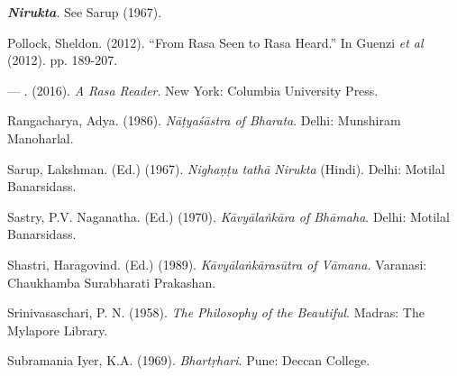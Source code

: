 \begin{thebibliography}{99}
  \textit{\textbf{Nirukta}}. See Sarup (1967).

  Pollock, Sheldon. (2012). “From Rasa Seen to Rasa Heard.” In Guenzi \textit{et al} (2012). pp. 189-207.

  — . (2016). \textit{A Rasa Reader}. New York: Columbia University Press.

  Rangacharya, Adya. (1986). \textit{Nāṭyaśāstra of Bharata}. Delhi: Munshiram Manoharlal.

  Sarup, Lakshman. (Ed.) (1967). \textit{Nighaṇṭu tathā Nirukta} (Hindi). Delhi: Motilal Banarsidass.

  Sastry, P.V. Naganatha. (Ed.) (1970).\textit{ Kāvyālaṅkāra of Bhāmaha}. Delhi: Motilal Banarsidass.

  Shastri, Haragovind. (Ed.) (1989). \textit{Kāvyālaṅkārasūtra of Vāmana.} Varanasi: Chaukhamba Surabharati Prakashan.

  Srinivasaschari, P. N. (1958). \textit{The Philosophy of the Beautiful}. Madras: The Mylapore Library.

  Subramania Iyer, K.A. (1969). \textit{Bhartṛhari}. Pune: Deccan College.

 \end{thebibliography}

\theendnotes
